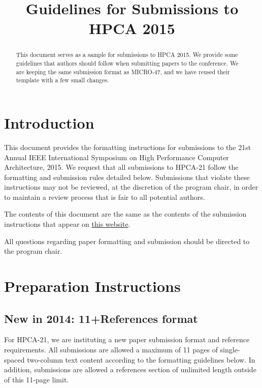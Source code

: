 \documentclass[pageno]{jpaper}
\begin{document}
\title{Guidelines for Submissions to HPCA 2015}

\date{}
\maketitle

\thispagestyle{empty}

\begin{abstract}
  This document serves as a sample for submissions to HPCA 2015.  We
  provide some guidelines that authors should follow when submitting
  papers to the conference.  We are keeping the same submission format
  as MICRO-47, and we have reused their template with a few small
  changes.
\end{abstract}

\section{Introduction}

This document provides the formatting instructions for submissions to
the 21st Annual IEEE International Symposium on High Performance
Computer Architecture, 2015. We request that all submissions to
HPCA-21 follow the formatting and submission rules detailed below.
Submissions that violate these instructions may not be reviewed, at
the discretion of the program chair, in order to maintain a review
process that is fair to all potential authors.

The contents of this document are the same as the contents of the
submission instructions that appear on
\href{http://www.darksilicon.org/hpca}{this website}.

All questions regarding paper formatting and submission should be
directed to the program chair.

\section{Preparation Instructions}


\subsection{New in 2014: 11+References format}

For HPCA-21, we are instituting a new paper submission format and
reference requirements. All submissions are allowed a maximum of 11
pages of single-spaced two-column text content according to the
formatting guidelines below.  In addition, submissions are allowed a
references section of unlimited length outside of this 11-page limit.
\end{document}
